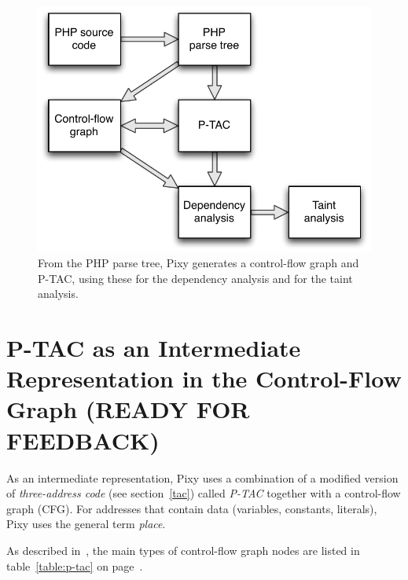 \begin{figure}[htb]
 \begin{center}
   \includegraphics[scale=0.75]{images/Pixy-Arbeitsweise}
   \caption{From the PHP parse tree, Pixy generates a control-flow graph and P-TAC, using these for the dependency analysis and for the taint analysis.}
   \label{fig:pixy-data-structures}
 \end{center}
\end{figure}

\section{P-TAC as an Intermediate Representation in the Control-Flow Graph (READY FOR FEEDBACK)}
\label{p-tac}

As an intermediate representation, Pixy uses a combination of a modified version of \emph{three-address code} (see section~\ref{tac}) called \emph{P-TAC} together with a control-flow graph (CFG). For addresses that contain data (variables, constants, literals), Pixy uses the general term \emph{place}.

As described in~\cite{pixy-dissertation}, the main types of control-flow graph nodes are listed in table~\ref{table:p-tac} on page~\pageref{table:p-tac}.

